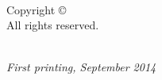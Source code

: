 \newpage
~\vfill
\thispagestyle{empty}


	       \ifx\myName\@empty\else
	          \noindent Copyright \copyright{} \the\year~\myName\\
                  All rights reserved.
	      \fi

\\


\noindent \textit{First printing, September 2014} %










